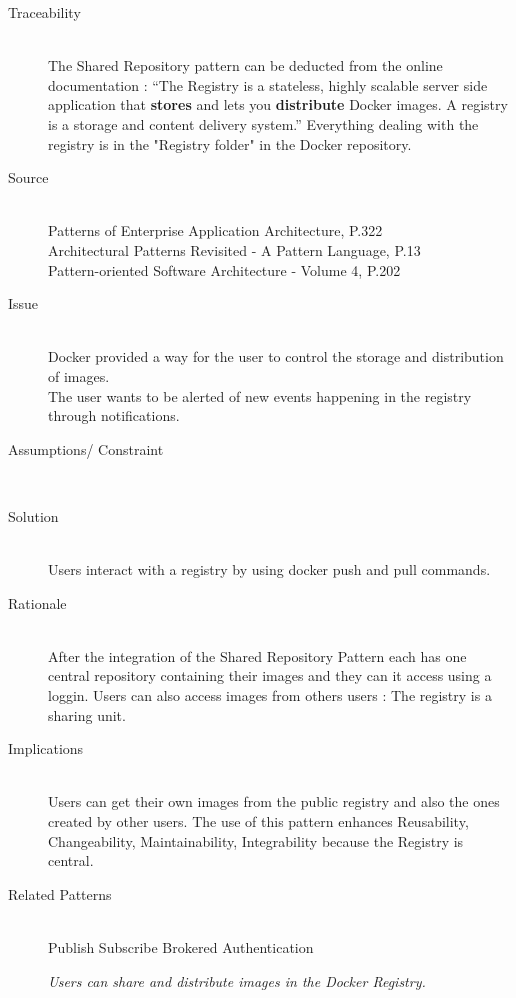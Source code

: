 \begin{description}
\item[Traceability]~\\
The Shared Repository pattern can be deducted from the online documentation : \cite{dockregistry} ``The Registry is a stateless, highly scalable server side application that \textbf{stores} and lets you \textbf{distribute} Docker images. A registry is a storage and content delivery system.''
Everything dealing with the registry is in the "Registry folder" in the Docker repository.


\item[Source]~\\
Patterns of Enterprise Application Architecture, P.322 \cite{eaa}\\
Architectural Patterns Revisited - A Pattern Language, P.13 \cite{avgeriou2005architectural}\\
Pattern-oriented Software Architecture - Volume 4, P.202 \cite{wiley4}

\item[Issue]~\\
Docker provided a way for the user to control the storage and distribution of images. \\
The user wants to be alerted of new events happening in the registry through notifications. %

\item[Assumptions/ Constraint]~\\

\item[Solution]~\\ %
Users interact with a registry by using docker push and pull commands. %

\item[Rationale]~\\ %
 After the integration of the Shared Repository Pattern each has one central repository containing their images and they can it access using a loggin.
 Users can also access images from others users : The registry is a sharing unit. \\
 
 \item [Implications]~\\
Users can get their own images from the public registry and also the ones created by other users. %
The use of this pattern enhances Reusability, Changeability, Maintainability, Integrability because the Registry is central.

\item [Related Patterns]~\\
Publish Subscribe 
Brokered Authentication

\textit{Users can share and distribute images in the Docker Registry.}
 
\end{description}

